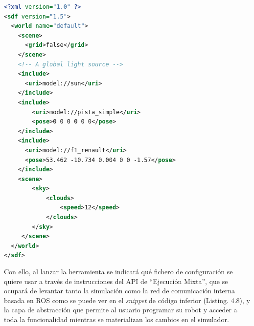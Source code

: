 \begin{lstlisting}[language=XML, caption=Configuración de Lanzamiento de Simulaciones]
<?xml version="1.0" ?>
<sdf version="1.5">
  <world name="default">
    <scene>
      <grid>false</grid>
    </scene>
    <!-- A global light source -->
    <include>
      <uri>model://sun</uri>
    </include>
    <include>
	    <uri>model://pista_simple</uri>
	    <pose>0 0 0 0 0 0</pose>
    </include>
    <include>
      <uri>model://f1_renault</uri>
      <pose>53.462 -10.734 0.004 0 0 -1.57</pose>
    </include>
    <scene>
        <sky>
            <clouds>
                <speed>12</speed>
            </clouds>
        </sky>
     </scene>
  </world>
</sdf>
\end{lstlisting}

Con ello, al lanzar la herramienta se indicará qué fichero de configuración se quiere usar a través de instrucciones del API de ``Ejecución Mixta'', que se ocupará de levantar tanto la simulación como la red de comunicación interna basada en ROS como se puede ver en el \textit{snippet} de código inferior (Listing. 4.8), y la capa de abstracción que permite al usuario programar su robot y acceder a toda la funcionalidad mientras se materializan los cambios en el simulador.

